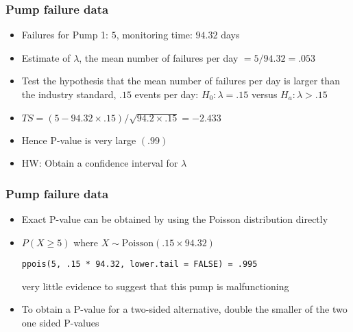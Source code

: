 \documentclass[aspectratio=169]{beamer}
\begin{document}
\begin{frame}\frametitle{Pump failure data}
\begin{itemize}
\item Failures for Pump 1: $5$, monitoring time: $94.32$ days
\item Estimate of $\lambda$, the mean number of failures per day $=5 / 94.32 = .053$
\item Test the hypothesis that the mean number of failures per day is larger
  than the industry standard, $.15$ events per day:
  $H_0 :\lambda = .15$ versus $H_a : \lambda > .15$ 
\item $TS = (5 - 94.32 \times .15) / \sqrt{94.2 \times .15} = -2.433$
\item Hence P-value is very large $(.99)$
\item HW: Obtain a confidence interval for $\lambda$ 
\end{itemize}
\end{frame}

\begin{frame}[fragile]\frametitle{Pump failure data}
\begin{itemize}
\item  Exact P-value can be obtained by using the Poisson distribution directly
\item  $P(X \geq 5)$ where $X \sim \mbox{Poisson}(.15 \times 94.32)$
\begin{verbatim}
ppois(5, .15 * 94.32, lower.tail = FALSE) = .995
\end{verbatim}
very little evidence to suggest that this pump is malfunctioning
\item To obtain a P-value for a two-sided alternative, double the
  smaller of the two one sided P-values
\end{itemize}
\end{frame}
\end{document}
